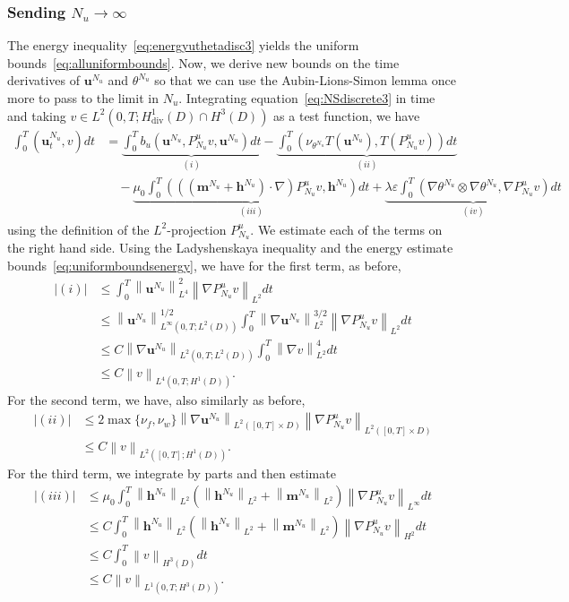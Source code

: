 \documentclass[10pt,letterpaper,twoside]{amsart}
\theoremstyle{definition}{\newtheorem{definition}[lemma]{Definition}}
\theoremstyle{note}{\newtheorem{claim}{Claim}[section]
\newtheorem*{claim*}{Claim}}
\numberwithin{equation}{section}
\newcommand{\dom}{D}
\newcommand{\norm}[1]{\left\| #1 \right\|}
\newcommand{\eps}{\varepsilon}
\newcommand{\Grad}{\nabla}
\newcommand{\Div}{\operatorname{div}}
\newcommand{\V}{H^1_{\Div}(\dom)}
\newcommand{\bmc}{\mathbf{m}^{N_u}}
\newcommand{\bhc}{\mathbf{h}^{N_u}}
\newcommand{\buc}{\mathbf{u}^{N_u}}
\newcommand{\thc}{\theta^{N_u}}
\begin{document}
 \subsubsection{Sending $N_u\to\infty$}
 \label{sec:Nu-limit}
 The energy inequality~\eqref{eq:energyuthetadisc3} yields the uniform bounds~\eqref{eq:alluniformbounds}. 
 Now, we derive  new bounds on the time derivatives of $\buc$ and $\thc$ so that we can use the Aubin-Lions-Simon lemma once more to pass to the limit in $N_u$.
  Integrating equation~\eqref{eq:NSdiscrete3} in time and taking $v\in L^2(0,T;\V\cap H^3(\dom))$ as a test function,  
  we have
 \begin{align*}
 	\int_0^T(\buc_t,v)dt &=\underbrace{\int_0^Tb_u(\buc,P^u_{N_u}v,\buc)dt}_{(i)} -\underbrace{\int_0^T(\nu_{\thc} T(\buc),T( P^u_{N_u}v)) dt}_{(ii)}\\
 	&\quad -\underbrace{\mu_0\int_0^T(((\bmc+\bhc)\cdot\Grad)P^u_{N_u}v,\bhc)dt}_{(iii)} +\underbrace{\lambda\eps\int_0^T(\Grad\thc\otimes\Grad\thc,\Grad P^u_{N_u}v)dt}_{(iv)} 
 \end{align*}
 using the definition of the $L^2$-projection $P^u_{N_u}$. We estimate each of the terms on the right hand side. Using the Ladyshenskaya inequality and the energy estimate bounds~\eqref{eq:uniformboundsenergy}, we have for the first term, as before,
 \begin{align*}
 	|(i)|& \leq \int_0^T\norm{\buc}_{L^4}^2\norm{\Grad P^u_{N_u} v}_{L^2} dt \\
 	& \leq \norm{\buc}_{L^\infty(0,T;L^2(\dom))}^{1/2}\int_0^T\norm{\Grad\buc}_{L^2}^{3/2}\norm{\Grad P^u_{N_u} v}_{L^2} dt \\
 	& \leq C \norm{\Grad \buc}_{L^2(0,T;L^2(\dom))}\int_0^T \norm{\Grad v}_{L^2}^4 dt\\
 	& \leq C \norm{v}_{L^4(0,T;H^1(\dom))}.
 \end{align*}
 For the second term, we have, also similarly as before,
 \begin{align*}
 	|(ii)|& \leq 2\max\{\nu_f,\nu_w\}\norm{\Grad\buc}_{L^2([0,T]\times\dom)}\norm{\Grad P^u_{N_u} v}_{L^2([0,T]\times\dom)}\\
 	& \leq C \norm{v}_{L^2([0,T];H^1(\dom))}.
 \end{align*}
 For the third term, we integrate by parts and then estimate
 \begin{align*}
 	|(iii)|&\leq \mu_0 \int_0^T\norm{\bhc}_{L^2}\left(\norm{\bhc}_{L^2}+\norm{\bmc}_{L^2}\right)\norm{\Grad P^u_{N_u} v}_{L^\infty}dt \\
 	&\leq C\int_0^T\norm{\bhc}_{L^2}\left(\norm{\bhc}_{L^2}+\norm{\bmc}_{L^2}\right)\norm{\Grad P^u_{N_u} v}_{H^2}dt \\
 	& \leq C \int_0^T \norm{ v}_{H^3(\dom)} dt\\
 	& \leq C \norm{v}_{L^1(0,T;H^3(\dom))}.
 \end{align*}
\end{document}
